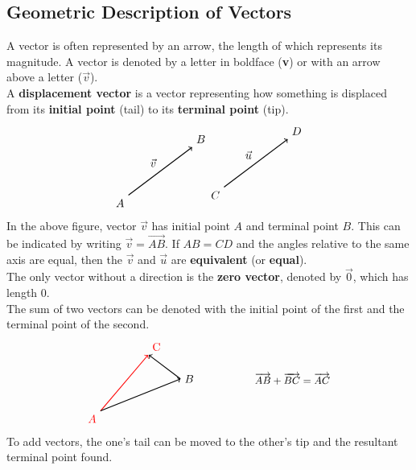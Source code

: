 \documentclass[../Calculus_\Roman{3}]{subfiles}
\begin{document}
			\subsection*{Geometric Description of Vectors}
				A vector is often represented by an arrow, the length of which represents its magnitude. A vector is denoted by a letter in boldface (\textbf{v}) or with an arrow above a letter ($\vec{v}$). \\
				A \textbf{displacement vector} is a vector representing how something is displaced from its \textbf{initial point} (tail) to its \textbf{terminal point} (tip).
				\[\begin{tikzpicture}
					\draw[thick, ->] (0, 0) node[anchor = north east]{$A$} -- node[anchor = south east]{$\vec{v}$} ++ (2, 1.5) node[anchor = south west]{$B$};
					\draw[thick, ->] (3, 0.25) node[anchor = north east]{$C$} -- node[anchor = south east]{$\vec{u}$} ++ (2, 1.5) node[anchor = south west]{$D$};
				\end{tikzpicture}\]
				In the above figure, vector $\vec{v}$ has initial point $A$ and terminal point $B$. This can be indicated by writing $\vec{v} = \Vec{AB}$. If $AB = CD$ and the angles relative to the same axis are equal, then the $\vec{v}$ and $\vec{u}$ are \textbf{equivalent} (or \textbf{equal}). \\
				The only vector without a direction is the \textbf{zero vector}, denoted by $\vec{0}$, which has length 0. \\
				The sum of two vectors can be denoted with the initial point of the first and the terminal point of the second. \\
				\[\begin{tikzpicture}
					\draw[thick, ->, color = red] (0, 0) node[anchor = north east]{$A$} -- (1.49, 1.75) node[anchor = south west]{C};
					\draw[thick, ->] (0, 0) -- (2.5, 1) node[anchor = west]{$B$};
					\draw[thick, ->] (2.5, 1) -- (1.51, 1.75);
					\node[] at (6, 1){\small$\Vec{AB} + \Vec{BC} = \Vec{AC}$};
				\end{tikzpicture}\]
				To add vectors, the one's tail can be moved to the other's tip and the resultant terminal point found.
\end{document}
